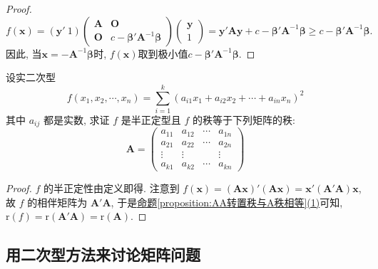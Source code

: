 \documentclass[../../main.tex]{subfiles}%
\begin{document}
\begin{proof}
\[
f(\boldsymbol{x})=(\boldsymbol{y}'\ 1)\begin{pmatrix}
\boldsymbol{A} & \boldsymbol{O} \\
\boldsymbol{O} & c - \boldsymbol{\beta}'\boldsymbol{A}^{-1}\boldsymbol{\beta}
\end{pmatrix}\begin{pmatrix}
\boldsymbol{y} \\
1
\end{pmatrix}=\boldsymbol{y}'\boldsymbol{A}\boldsymbol{y}+c - \boldsymbol{\beta}'\boldsymbol{A}^{-1}\boldsymbol{\beta}\geqslant  c - \boldsymbol{\beta}'\boldsymbol{A}^{-1}\boldsymbol{\beta}.
\]
因此, 当$\boldsymbol{x}=-\boldsymbol{A}^{-1}\boldsymbol{\beta}$时, $f(\boldsymbol{x})$取到极小值$c - \boldsymbol{\beta}'\boldsymbol{A}^{-1}\boldsymbol{\beta}$. 

\end{proof}

\begin{proposition}\label{proposition:和的平方和的半正定型的秩等于其系数矩阵的秩}
设实二次型
\[f(x_1,x_2,\cdots,x_n)=\sum_{i = 1}^{k}(a_{i1}x_1 + a_{i2}x_2 + \cdots + a_{in}x_n)^2\]
其中 \(a_{ij}\) 都是实数, 求证 \(f\) 是半正定型且 \(f\) 的秩等于下列矩阵的秩:
\[
\boldsymbol{A} = \begin{pmatrix}
a_{11} & a_{12} & \cdots & a_{1n} \\
a_{21} & a_{22} & \cdots & a_{2n} \\
\vdots & \vdots & & \vdots \\
a_{k1} & a_{k2} & \cdots & a_{kn}
\end{pmatrix}
\]
\end{proposition}
\begin{proof}

\(f\) 的半正定性由定义即得. 注意到 \(f(\boldsymbol{x}) = (\boldsymbol{A}\boldsymbol{x})'(\boldsymbol{A}\boldsymbol{x}) = \boldsymbol{x}'(\boldsymbol{A}'\boldsymbol{A})\boldsymbol{x}\), 故 \(f\) 的相伴矩阵为 \(\boldsymbol{A}'\boldsymbol{A}\), 于是\hyperref[proposition:AA转置秩与A秩相等]{命题\ref{proposition:AA转置秩与A秩相等}(1)}可知, \(\mathrm{r}(f)=\mathrm{r}(\boldsymbol{A}'\boldsymbol{A})=\mathrm{r}(\boldsymbol{A})\). 

\end{proof}

\subsection{用二次型方法来讨论矩阵问题}
\end{document}
